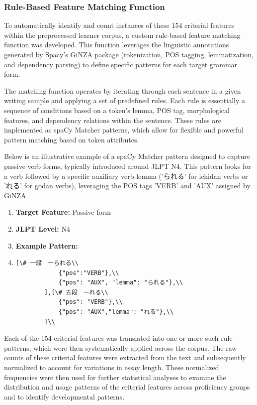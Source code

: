 \subsubsection{Rule-Based Feature Matching Function}

To automatically identify and count instances of these 154 criterial features within the preprocessed learner
corpus, a custom rule-based feature matching function was developed. This function leverages the linguistic
annotations generated by Spacy's GiNZA package (tokenization, POS tagging, lemmatization, and dependency parsing) to
define specific patterns for each target grammar form.

The matching function operates by iterating through each sentence in a given writing sample and applying a set of
predefined rules. Each rule is essentially a sequence of conditions based on a token's lemma, POS tag, morphological
features, and dependency relations within the sentence. These rules are implemented as spaCy Matcher patterns,
which allow for flexible and powerful pattern matching based on token attributes.

Below is an illustrative example of a spaCy Matcher pattern designed to capture passive verb forms, typically
introduced around JLPT N4. This pattern looks for a verb followed by a specific auxiliary verb lemma ('られる' for
ichidan verbs or 'れる' for godan verbs), leveraging the POS tags 'VERB' and 'AUX' assigned by GiNZA.

\begin{enumerate}
\item \textbf{Target Feature:} Passive form
\item \textbf{JLPT Level:} N4
\item \textbf{Example Pattern:}
\item[] 
\begin{lstlisting}
[\# 一段　ーられる\\
            {"pos":"VERB"},\\
            {"pos": "AUX", "lemma": "られる"},\\
        ],[\# 五段　ーれる\\
            {"pos": "VERB"},\\
            {"pos": "AUX","lemma": "れる"},\\
        ]\\
\end{lstlisting}
\end{enumerate}

Each of the 154 criterial features was translated into one or more such rule patterns, which were then
systematically applied across the corpus. The raw counts of these criterial
features were extracted from the text and subsequently normalized to account for variations in
essay length. These normalized frequencies were then used for further statistical analyses to
examine the
distribution and usage patterns of the criterial features across proficiency groups and to identify developmental
patterns.


